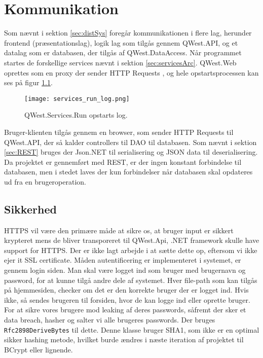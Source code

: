 \chapter{Kommunikation}\label{ch:communication}
Som nævnt i sektion \ref{sec:distSys} foregår kommunikationen i flere lag, herunder frontend (præsentationslag), logik lag som tilgås gennem QWest.API, og et datalag som er databasen, der tilgås af QWest.DataAccess. 
Når programmet startes de forskellige services nævnt i sektion \ref{sec:servicesArc}. QWest.Web oprettes som en proxy der sender HTTP Requests \cite{DistributedSystems}, og hele opstartsprocessen kan ses på figur \ref{fig:startup_log}.

\begin{figure}[h]
    \texttt{[image: services\_run\_log.png]}
    \caption{QWest.Services.Run opstarts log.}
    \label{fig:startup_log}
\end{figure}

Bruger-klienten tilgås gennem en browser, som sender HTTP Requests til QWest.API, der så kalder controllers til DAO til databasen. Som nævnt i sektion \ref{sec:REST} bruges der Json.NET til serialisering og JSON data til deserialisering. Da projektet er gennemført med REST, er der ingen konstant forbindelse til databasen, men i stedet laves der kun forbindelser når databasen skal opdateres ud fra en brugeroperation. 

\section{Sikkerhed}\label{sec:security}
HTTPS vil være den primære måde at sikre os, at bruger input er sikkert krypteret mens de bliver transporeret til QWest.Api, .NET framework skulle have support for HTTPS. \cite{DotNetFrameworkSSL} Der er ikke lagt arbejde i at sætte dette op, eftersom vi ikke ejer it SSL certificate. 
Måden autentificering er implementeret i systemet, er gennem login siden. Man skal være logget ind som bruger med brugernavn og password, for at kunne tilgå andre dele af systemet. Hver file-path som kan tilgås på hjemmesiden, checker om det er den korrekte bruger der er logget ind. Hvis ikke, så sendes brugeren til forsiden, hvor de kan logge ind eller oprette bruger.
For at sikre vores brugere mod leaking af deres passwords, såfremt der sker et data breach, hasher og salter vi alle brugeres passwords. Der bruges \texttt{Rfc2898DeriveBytes} \cite{Rfc2898DeriveBytes} til dette. Denne klasse bruger SHA1, som ikke er en optimal sikker hashing metode, hvilket burde ændres i næste iteration af projektet \cite{HowsecureisSHA1} til BCrypt \cite{BCrypt} eller lignende.

